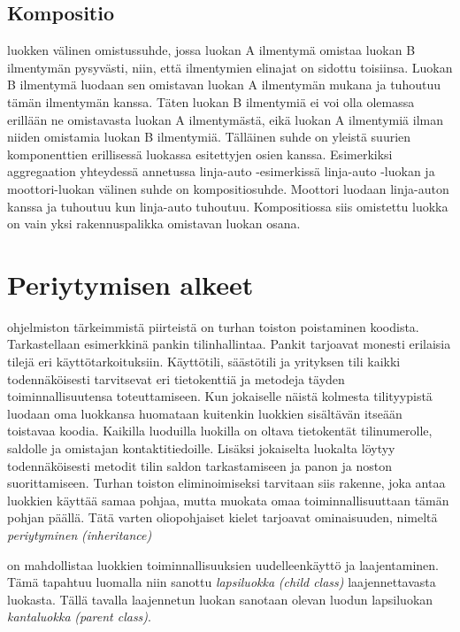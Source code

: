 \documentclass[a4paper,justified,notoc]{tufte-book}
\newcommand{\eng}[1]{\textit{(#1)}}
\newcommand{\new}[1]{\textit{\gls{#1}}}
\newcommand{\neweng}[2]{\new{#1} \eng{#2}}
\begin{document}
\begin{fullwidth}
\subsection{Kompositio}
\label{kompositio}

 luokken välinen omistussuhde, jossa luokan A ilmentymä omistaa
luokan B ilmentymän pysyvästi, niin, että ilmentymien elinajat on sidottu toisiinsa. Luokan B
ilmentymä luodaan sen omistavan luokan A ilmentymän mukana ja tuhoutuu tämän ilmentymän kanssa.
Täten luokan B ilmentymiä ei voi olla olemassa erillään ne omistavasta luokan A ilmentymästä,
eikä luokan A ilmentymiä ilman niiden omistamia luokan B ilmentymiä. Tälläinen suhde on yleistä
suurien komponenttien erillisessä luokassa esitettyjen osien kanssa. Esimerkiksi aggregaation
yhteydessä annetussa linja-auto -esimerkissä linja-auto -luokan ja moottori-luokan välinen suhde
on kompositiosuhde. Moottori luodaan linja-auton kanssa ja tuhoutuu kun linja-auto tuhoutuu.
Kompositiossa siis omistettu luokka on vain yksi rakennuspalikka omistavan luokan osana.


\section{Periytymisen alkeet}
\label{periytyminen1}

 ohjelmiston tärkeimmistä piirteistä on turhan toiston poistaminen
koodista. Tarkastellaan esimerkkinä pankin tilinhallintaa. Pankit tarjoavat monesti erilaisia
tilejä eri käyttötarkoituksiin. Käyttötili, säästötili ja yrityksen tili kaikki todennäköisesti
tarvitsevat eri tietokenttiä ja metodeja täyden toiminnallisuutensa toteuttamiseen. Kun jokaiselle
näistä kolmesta tilityypistä luodaan oma luokkansa huomataan kuitenkin luokkien sisältävän
itseään toistavaa koodia. Kaikilla luoduilla luokilla on oltava tietokentät tilinumerolle,
saldolle ja omistajan kontaktitiedoille. Lisäksi jokaiselta luokalta löytyy todennäköisesti
metodit tilin saldon tarkastamiseen ja panon ja noston suorittamiseen. Turhan toiston
eliminoimiseksi tarvitaan siis rakenne, joka antaa luokkien käyttää samaa pohjaa, mutta muokata
omaa toiminnallisuuttaan tämän pohjan päällä. Tätä varten oliopohjaiset kielet tarjoavat
ominaisuuden, nimeltä \neweng{periytyminen}{inheritance}

 on mahdollistaa luokkien toiminnallisuuksien uudelleenkäyttö
ja laajentaminen. Tämä tapahtuu luomalla niin sanottu \neweng{lapsiluokka}{child class}
laajennettavasta luokasta. Tällä tavalla laajennetun luokan sanotaan olevan luodun lapsiluokan
\neweng{kantaluokka}{parent class}.


\end{fullwidth}
\end{document}
